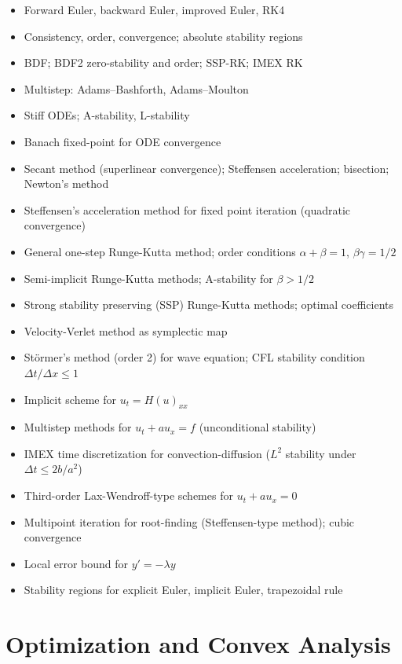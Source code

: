 \documentclass{amsart}
\begin{document}
\begin{itemize}
  \item Forward Euler, backward Euler, improved Euler, RK4
  \item Consistency, order, convergence; absolute stability regions
  \item BDF; BDF2 zero-stability and order; SSP-RK; IMEX RK
  \item Multistep: Adams--Bashforth, Adams--Moulton
  \item Stiff ODEs; A-stability, L-stability
  \item Banach fixed-point for ODE convergence
  \item Secant method (superlinear convergence); Steffensen acceleration; bisection; Newton's method
  \item Steffensen's acceleration method for fixed point iteration (quadratic convergence)
  \item General one-step Runge-Kutta method; order conditions $\alpha+\beta=1$, $\beta\gamma=1/2$
  \item Semi-implicit Runge-Kutta methods; A-stability for $\beta > 1/2$
  \item Strong stability preserving (SSP) Runge-Kutta methods; optimal coefficients
  \item Velocity-Verlet method as symplectic map
  \item St\"ormer's method (order 2) for wave equation; CFL stability condition $\Delta t / \Delta x \leq 1$
  \item Implicit scheme for $u_t = H(u)_{xx}$
  \item Multistep methods for $u_t + au_x = f$ (unconditional stability)
  \item IMEX time discretization for convection-diffusion ($L^2$ stability under $\Delta t \leq 2b/a^2$)
  \item Third-order Lax-Wendroff-type schemes for $u_t + au_x = 0$
  \item Multipoint iteration for root-finding (Steffensen-type method); cubic convergence
  \item Local error bound for $y' = -\lambda y$
  \item Stability regions for explicit Euler, implicit Euler, trapezoidal rule
\end{itemize}

\section{Optimization and Convex Analysis}
\end{document}
